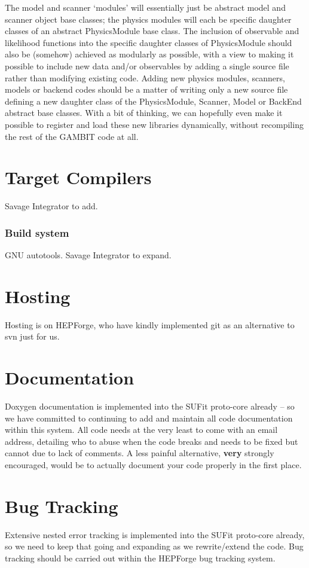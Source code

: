 The model and scanner `modules' will essentially just be abstract model and scanner object base classes; the physics modules will each be specific daughter classes of an abstract PhysicsModule base class.  The inclusion of observable and likelihood functions into the specific daughter classes of PhysicsModule should also be (somehow) achieved as modularly as possible, with a view to making it possible to include new data and/or observables by adding a single source file rather than modifying existing code.  Adding new physics modules, scanners, models or backend codes should be a matter of writing only a new source file defining a new daughter class of the PhysicsModule, Scanner, Model or BackEnd abstract base classes.  With a bit of thinking, we can hopefully even make it possible to register and load these new libraries dynamically, without recompiling the rest of the GAMBIT code at all.

\section{Target Compilers}

Savage Integrator to add.

\subsubsection{Build system}

GNU autotools.  Savage Integrator to expand.

\section{Hosting}

Hosting is on HEPForge, who have kindly implemented git as an alternative to svn just for us.

\section{Documentation}

Doxygen documentation is implemented into the SUFit proto-core already -- so we have committed to continuing to add and maintain all code documentation within this system.  All code needs at the very least to come with an email address, detailing who to abuse when the code breaks and needs to be fixed but cannot due to lack of comments.  A less painful alternative, \textbf{very} strongly encouraged, would be to actually document your code properly in the first place.

\section{Bug Tracking}

Extensive nested error tracking is implemented into the SUFit proto-core already, so we need to keep that going and expanding as we rewrite/extend the code.  Bug tracking should be carried out within the HEPForge bug tracking system.


